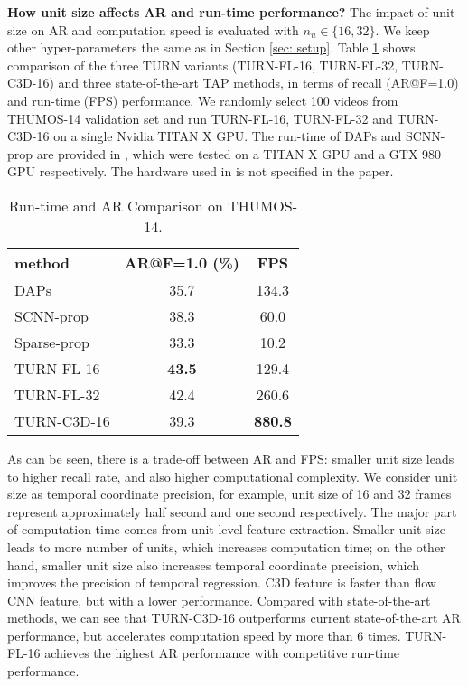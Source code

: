 \documentclass[10pt,twocolumn,letterpaper]{article}
\begin{document}
\textbf{How unit size affects AR and run-time performance?}
The impact of unit size on AR and computation speed is evaluated with $n_u \in \{16,32\}$. We keep other hyper-parameters the same as in Section \ref{sec: setup}. Table \ref{tbl:fps} shows comparison of the three TURN variants (TURN-FL-16, TURN-FL-32, TURN-C3D-16) and three state-of-the-art TAP methods, in terms of recall (AR@F=1.0) and run-time (FPS) performance. We randomly select 100 videos from THUMOS-14 validation set and run TURN-FL-16, TURN-FL-32 and TURN-C3D-16 on a single Nvidia TITAN X GPU. The run-time of DAPs \cite{escorcia2016daps} and SCNN-prop \cite{Shou_2016_CVPR} are provided in \cite{escorcia2016daps}, which were tested on a TITAN X GPU and a GTX 980 GPU respectively. The hardware used in \cite{Heilbron_2016_CVPR} is not specified in the paper.
\begin{table}[h]
\centering
\caption{Run-time and AR Comparison on THUMOS-14.}
\label{tbl:fps}
\begin{tabular}{l|cc}
\hline
method      & AR@F=1.0 (\%) & FPS   \\ \hline
DAPs \cite{escorcia2016daps}        & 35.7     & 134.3 \\
SCNN-prop \cite{Shou_2016_CVPR}   & 38.3     & 60.0  \\
Sparse-prop \cite{Heilbron_2016_CVPR} & 33.3     & 10.2  \\ \hline 
TURN-FL-16     & \textbf{43.5}     & 129.4 \\
TURN-FL-32     & 42.4     & 260.6 \\
TURN-C3D-16     & 39.3     & \textbf{880.8} \\ \hline
\end{tabular}
\end{table}

As can be seen, there is a trade-off between AR and FPS: smaller unit size leads to higher recall rate, and also higher computational complexity. We consider unit size as temporal coordinate precision, for example,  unit size of 16 and 32 frames represent approximately half second and one second respectively. The major part of computation time comes from unit-level feature extraction. Smaller unit size leads to more number of units, which increases computation time; on the other hand, smaller unit size also increases temporal coordinate precision, which improves the precision of temporal regression. C3D feature is faster than flow CNN feature, but with a lower performance. Compared with state-of-the-art methods, we can see that TURN-C3D-16 outperforms current state-of-the-art AR performance, but accelerates computation speed by more than 6 times. TURN-FL-16 achieves the highest AR performance with competitive run-time performance. 
\end{document}
